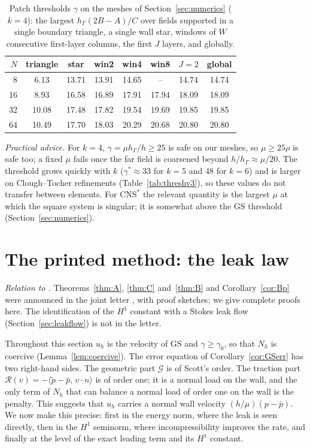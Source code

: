 \documentclass[pdflatex,sn-mathphys-num]{sn-jnl}
\theoremstyle{thmstyleone}
\theoremstyle{thmstylethree}
\newcommand{\hG}{h_\Gamma}
\newcommand{\pt}{\tilde p}
\newcommand{\pbar}{\bar p}
\newcommand{\ip}[2]{\langle #1,\, #2\rangle}
\newcommand{\GS}{\mathrm{GS}}
\newcommand{\CNS}{\mathrm{CNS}^\ast}
\newcommand{\Rc}{\mathcal R}
\newcommand{\Gc}{\mathcal G}
\begin{document}
\begin{table}[t]
\centering\small
\caption{Patch thresholds $\gamma$ on the meshes of Section~\ref{sec:numerics} ($k=4$): the largest $\hG(2B-A)/C$ over fields supported in a single boundary triangle, a single wall star, windows of $W$ consecutive first-layer columns, the first $J$ layers, and globally.}\label{tab:patch}
\begin{tabular}{rccccccc}
\toprule
$N$ & triangle & star & win2 & win4 & win8 & $J=2$ & global\\
\midrule
8 & 6.13 & 13.71 & 13.91 & 14.65 & -- & 14.74 & 14.74\\
16 & 8.93 & 16.58 & 16.89 & 17.91 & 17.94 & 18.09 & 18.09\\
32 & 10.08 & 17.48 & 17.82 & 19.54 & 19.69 & 19.85 & 19.85\\
64 & 10.49 & 17.70 & 18.03 & 20.29 & 20.68 & 20.80 & 20.80\\
\bottomrule
\end{tabular}
\end{table}

\emph{Practical advice.} For $k=4$, $\gamma=\mu\hG/h\ge25$ is safe on our meshes, so $\mu\ge25\rho$ is safe too; a fixed $\mu$ fails once the far field is coarsened beyond $h/\hG\approx\mu/20$. The threshold grows quickly with $k$ ($\gamma^\ast\approx33$ for $k=5$ and $48$ for $k=6$) and is larger on Clough--Tocher refinements (Table~\ref{tab:threshv3}), so these values do not transfer between elements. For $\CNS$ the relevant quantity is the largest $\mu$ at which the square system is singular; it is somewhat above the $\GS$ threshold (Section~\ref{sec:numerics}).

\section{The printed method: the leak law}\label{sec:printed}

\emph{Relation to \cite{CavalcantePadhiLetter}.} Theorems~\ref{thm:A}, \ref{thm:C} and~\ref{thm:B} and Corollary~\ref{cor:Bp} were announced in the joint letter \cite{CavalcantePadhiLetter}, with proof sketches; we give complete proofs here. The identification of the $H^1$ constant with a Stokes leak flow (Section~\ref{sec:leakflow}) is not in the letter.

Throughout this section $u_h$ is the velocity of $\GS$ and $\gamma\ge\gamma_0$, so that $N_h$ is coercive (Lemma~\ref{lem:coercive}). The error equation of Corollary~\ref{cor:GSerr} has two right-hand sides. The geometric part $\Gc$ is of Scott's order. The traction part $\Rc(v)=-\ip{\pt-\pbar}{v\cdot n}$ is of order one; it is a normal load on the wall, and the only term of $N_h$ that can balance a normal load of order one on the wall is the penalty. This suggests that $u_h$ carries a normal wall velocity $(h/\mu)(p-\pbar)$. We now make this precise: first in the energy norm, where the leak is seen directly, then in the $H^1$ seminorm, where incompressibility improves the rate, and finally at the level of the exact leading term and its $H^1$ constant.
\end{document}
